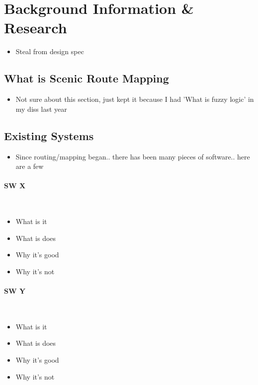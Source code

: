 \section{Background Information \& Research}
{\color{red}
	\begin{itemize}
		\item Steal from design spec
	\end{itemize}
}


\subsection{What is Scenic Route Mapping}
{\color{red}
	\begin{itemize}
		\item Not sure about this section, just kept it because I had 'What is fuzzy logic' in my diss last year
	\end{itemize}
}

\subsection{Existing Systems}
\label{sec:existing-systems}
{\color{red}
	\begin{itemize}
		\item Since routing/mapping began.. there has been many pieces of software.. here are a few
	\end{itemize}
}

\paragraph{SW X}\ \\
{\color{red}
	\begin{itemize}
		\item What is it
		\item What is does
		\item Why it's good
		\item Why it's not
	\end{itemize}
}

\paragraph{SW Y}\ \\
{\color{red}
	\begin{itemize}
		\item What is it
		\item What is does
		\item Why it's good
		\item Why it's not
	\end{itemize}
}

